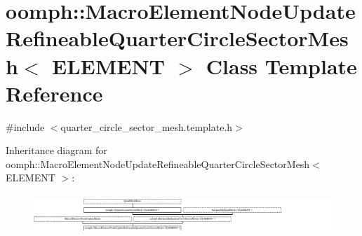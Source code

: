 \hypertarget{classoomph_1_1MacroElementNodeUpdateRefineableQuarterCircleSectorMesh}{}\section{oomph\+:\+:Macro\+Element\+Node\+Update\+Refineable\+Quarter\+Circle\+Sector\+Mesh$<$ E\+L\+E\+M\+E\+NT $>$ Class Template Reference}
\label{classoomph_1_1MacroElementNodeUpdateRefineableQuarterCircleSectorMesh}


{\ttfamily \#include $<$quarter\+\_\+circle\+\_\+sector\+\_\+mesh.\+template.\+h$>$}

Inheritance diagram for oomph\+:\+:Macro\+Element\+Node\+Update\+Refineable\+Quarter\+Circle\+Sector\+Mesh$<$ E\+L\+E\+M\+E\+NT $>$\+:\begin{figure}[H]
\begin{center}
\leavevmode
\includegraphics[height=1.490353cm]{classoomph_1_1MacroElementNodeUpdateRefineableQuarterCircleSectorMesh}
\end{center}
\end{figure}
